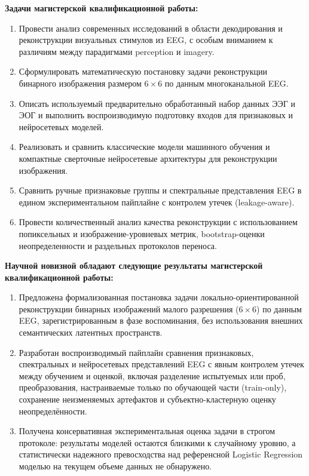 \textbf{Задачи магистерской квалификационной работы:}
\begin{enumerate}
\item Провести анализ современных исследований в области декодирования и реконструкции визуальных стимулов из EEG, с особым вниманием к различиям между парадигмами perception и imagery.
\item Сформулировать математическую постановку задачи реконструкции бинарного изображения размером $6\times6$ по данным многоканальной EEG.
\item Описать используемый предварительно обработанный набор данных ЭЭГ и ЭОГ и выполнить воспроизводимую подготовку входов для признаковых и нейросетевых моделей.
\item Реализовать и сравнить классические модели машинного обучения и компактные сверточные нейросетевые архитектуры для реконструкции изображения.
\item Сравнить ручные признаковые группы и спектральные представления EEG в едином экспериментальном пайплайне с контролем утечек (leakage-aware).
\item Провести количественный анализ качества реконструкции с использованием попиксельных и изображение-уровневых метрик, bootstrap-оценки неопределенности и раздельных протоколов переноса.
\end{enumerate}


\textbf{Научной новизной обладают следующие результаты магистерской квалификационной работы:}
\begin{enumerate}
\item Предложена формализованная постановка задачи локально-ориентированной реконструкции бинарных изображений малого разрешения ($6\times6$) по данным EEG, зарегистрированным в фазе воспоминания, без использования внешних семантических латентных пространств.
\item Разработан воспроизводимый пайплайн сравнения признаковых, спектральных и нейросетевых представлений EEG с явным контролем утечек между обучением и оценкой, включая разделение испытуемых или проб, преобразования, настраиваемые только по обучающей части (train-only), сохранение неизменяемых артефактов и субъектно-кластерную оценку неопределённости.
\item Получена консервативная экспериментальная оценка задачи в строгом протоколе: результаты моделей остаются близкими к случайному уровню, а статистически надежного превосходства над референсной Logistic Regression моделью на текущем объеме данных не обнаружено.
\end{enumerate}


